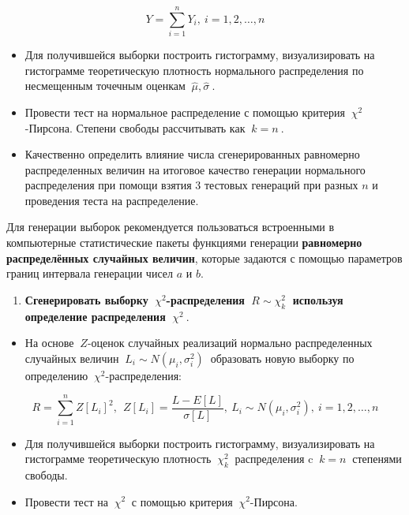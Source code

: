 \documentclass[
]{article}
\providecommand{\tightlist}{%
  \setlength{\itemsep}{0pt}\setlength{\parskip}{0pt}}
\begin{document}
\[
Y = \sum_{i=1}^{n} Y_i, \ i=1,2,\dots, n
\]

\begin{itemize}
\item
  Для получившейся выборки построить гистограмму, визуализировать на
  гистограмме теоретическую плотность нормального распределения по
  несмещенным точечным оценкам \(\ \hat{\mu}, \hat{\sigma}\ \).
\item
  Провести тест на нормальное распределение с помощью критерия
  \(\ \chi^2\)-Пирсона. Степени свободы рассчитывать как \(\ k = n\ \).
\item
  Качественно определить влияние числа сгенерированных равномерно
  распределенных величин на итоговое качество генерации нормального
  распределения при помощи взятия 3 тестовых генераций при разных \(n\)
  и проведения теста на распределение.
\end{itemize}

Для генерации выборок рекомендуется пользоваться встроенными в
компьютерные статистические пакеты функциями генерации
\textbf{равномерно распределённых случайных величин}, которые задаются с
помощью параметров границ интервала генерации чисел \(a\) и \(b\).

\begin{enumerate}
\def\labelenumi{\arabic{enumi}.}
\setcounter{enumi}{1}
\tightlist
\item
  \textbf{Сгенерировать выборку \(\ \chi^2\)-распределения
  \(\ R \sim \chi_{k}^2\ \) используя определение распределения
  \(\ \chi^2\ \)}.
\end{enumerate}

\begin{itemize}
\tightlist
\item
  На основе \(\ Z\)-оценок случайных реализаций нормально распределенных
  случайных величин \(\ L_{i} \sim N(\mu_i, \sigma_i^2)\ \) образовать
  новую выборку по определению \(\ \chi^2\)-распределения:
\end{itemize}

\[
R = \sum_{i = 1}^{n} Z[L_i]^2,\ \ Z[L_i] = \frac{L - E[L]}{\sigma[L]}, \ L_i \sim N(\mu_i, \sigma_i^2),\ i = 1,2,\dots,n
\]

\begin{itemize}
\item
  Для получившейся выборки построить гистограмму, визуализировать на
  гистограмме теоретическую плотность \(\ \chi_k^2\ \) распределения c
  \(\ k = n\ \) степенями свободы.
\item
  Провести тест на \(\ \chi^2\ \) с помощью критерия
  \(\ \chi^2\)-Пирсона.
\end{itemize}
\end{document}
